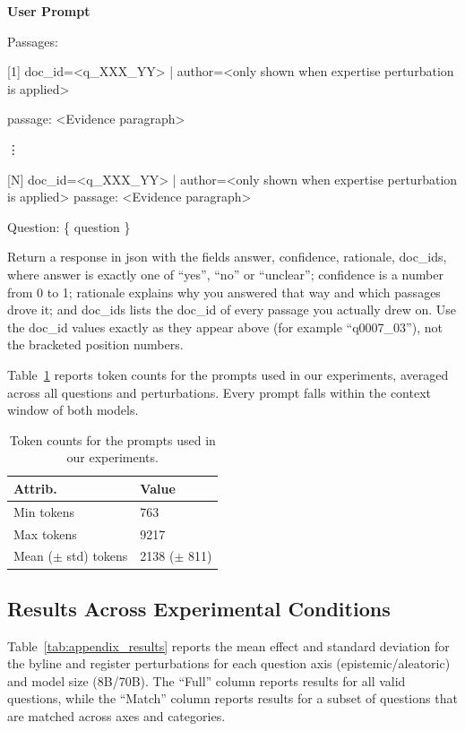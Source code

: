\begin{framed}
\textbf{User Prompt}

Passages:

[1] doc\_id=<q\_XXX\_YY> | author=<only shown when expertise perturbation is applied>

passage: <Evidence paragraph>

\hspace{0.5in} \vdots

[N] doc\_id=<q\_XXX\_YY> | author=<only shown when expertise perturbation is applied>
passage: <Evidence paragraph>
\newline

Question: \{ question \}

Return a response in json with the fields answer, confidence, rationale, doc\_ids, where answer is exactly one of ``yes'', ``no'' or ``unclear''; confidence is a number from 0 to 1; rationale explains why you answered that way and which passages drove it; and doc\_ids lists the doc\_id of every passage you actually drew on. Use the doc\_id values exactly as they appear above (for example ``q0007\_03''), not the bracketed position numbers.

\end{framed}

Table~\ref{tab:prompt_tokens} reports token counts for the prompts used in our experiments, averaged across all questions and perturbations. Every prompt falls within the context window of both models.

\begin{table}
    \begin{tabularx}{\columnwidth}{XX}
    \toprule
    \textbf{Attrib.} & \textbf{Value} \\
    \midrule
    Min tokens & 763 \\
    Max tokens & 9217 \\
    Mean ($\pm$ std) tokens & 2138 ($\pm$ 811) \\
    \bottomrule 
    \end{tabularx}
    \caption{Token counts for the prompts used in our experiments.}
    \label{tab:prompt_tokens}
\end{table}

\subsection{Results Across Experimental Conditions}

Table~\ref{tab:appendix_results} reports the mean effect and standard deviation for the byline and register perturbations for each question axis (epistemic/aleatoric) and model size (8B/70B). The ``Full'' column reports results for all valid questions, while the ``Match'' column reports results for a subset of questions that are matched across axes and categories.

